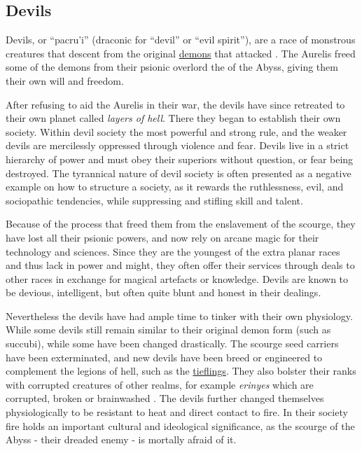 \subsection{Devils}
\label{sec:Devils}

Devils, or ``pacru'i'' (draconic for ``devil'' or ``evil spirit''), are a
race of monstrous creatures that descent from the original
\hyperref[sec:Demons]{demons} that attacked . The Aurelis
freed some of the demons from their psionic overlord the 
of the Abyss, giving them their own will and freedom.

After refusing to aid the Aurelis in their war, the devils have since
retreated to their own planet called \emph{layers of hell}. There they began to
establish their own society. Within devil society the most powerful and strong
rule, and the weaker devils are mercilessly oppressed through violence and
fear. Devils live in a strict hierarchy of power and must obey their
superiors without question, or fear being destroyed. The tyrannical nature of
devil society is often presented as a negative example on how to structure a
society, as it rewards the ruthlessness, evil, and sociopathic tendencies,
while suppressing and stifling skill and talent.

Because of the process that freed them from the enslavement of the scourge,
they have lost all their psionic powers, and now rely on arcane magic for
their technology and sciences. Since they are the youngest of the extra planar
races and thus lack in power and might, they often offer their services
through deals to other races in exchange for magical artefacts or
knowledge. Devils are known to be devious, intelligent, but often quite blunt
and honest in their dealings.

Nevertheless the devils have had ample time to tinker with their own
physiology. While some devils still remain similar to their original demon
form (such as succubi), while some have been changed drastically. The scourge
seed carriers have been exterminated, and new devils have been breed or
engineered to complement the legions of hell, such as the
\hyperref[sec:Tieflings]{tieflings}. They also bolster their ranks with
corrupted creatures of other realms, for example \emph{erinyes} which are
corrupted, broken or brainwashed . The devils further
changed themselves physiologically to be resistant to heat and direct contact
to fire. In their society fire holds an important cultural and ideological
significance, as the scourge of the Abyss - their dreaded enemy - is mortally
afraid of it.


